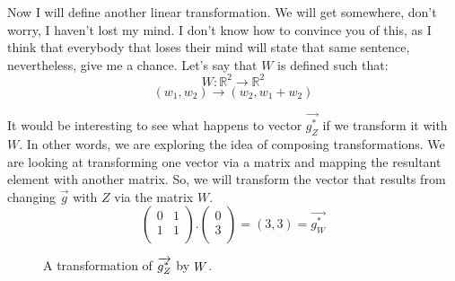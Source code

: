 \documentclass[a4,12pt,twosided,openany]{memoir}
\begin{document}
\par 
\indent
Now I will define another linear transformation. We will get somewhere, don’t worry, I haven’t lost my mind. I don’t know how to convince you of this, as I think that everybody that loses their mind will state that same sentence, nevertheless, give me a chance. Let’s say that $W$ is defined such that:
\[W:\mathbb{R}^2 \rightarrow \mathbb{R}^2\]
\[(w_1,w_2) \rightarrow (w_2, w_1 + w_2) \]
\par 
\indent
It would be interesting to see what happens to vector $\overrightarrow{g_Z^*}$ if we transform it with $W$. In other words, we are exploring the idea of composing transformations. We are looking at transforming one vector  via a matrix and mapping the resultant element with another matrix. 
\newpage
So, we will transform the vector that results from changing  $\overrightarrow{g}$ with $Z$ via the matrix $W$.
\[\begin{pmatrix}
0 & 1   \\
1 & 1 \\
\end{pmatrix}.\begin{pmatrix}
0   \\
3  \\
\end{pmatrix} = (3,3) = \overrightarrow{g_W^*}
\]
\begin{figure}[h!]
\begin{center}
\end{center}
\caption{A transformation of $\protect\overrightarrow{g_Z^*}$  by $\protect W$.}
\end{figure}
\end{document}
